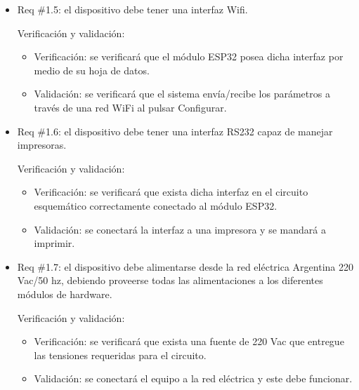 \documentclass[11pt]{charter}
\begin{document}
\begin{itemize} 
\item Req \#1.5: el dispositivo debe tener una interfaz Wifi.

Verificación y validación:

\begin{itemize}
\item Verificación: se verificará que el módulo ESP32 posea dicha interfaz por medio de su hoja de datos. 
\item Validación: se verificará que el sistema envía/recibe los parámetros a través de una red WiFi al pulsar Configurar. 
\end{itemize}

\end{itemize}

\begin{itemize} 
\item Req \#1.6: el dispositivo debe tener una interfaz RS232 capaz de manejar impresoras.

Verificación y validación:

\begin{itemize}
\item Verificación: se verificará que exista dicha interfaz en el circuito esquemático correctamente conectado al módulo ESP32.
\item Validación: se conectará la interfaz a una impresora y se mandará a imprimir.
\end{itemize}

\end{itemize}

\begin{itemize} 
\item Req \#1.7: el dispositivo debe alimentarse desde la red eléctrica Argentina 220 Vac/50 hz, debiendo proveerse todas las alimentaciones a los diferentes módulos de hardware.

Verificación y validación:

\begin{itemize}
\item Verificación: se verificará que exista una fuente de 220 Vac que entregue las tensiones requeridas para el circuito.
\item Validación: se conectará el equipo a la red eléctrica y este debe funcionar. 
\end{itemize}

\end{itemize}
\end{document}
